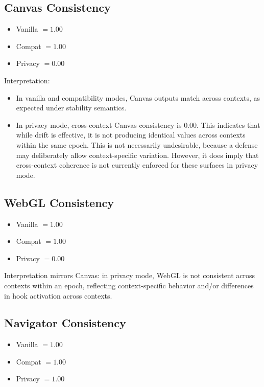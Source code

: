 \documentclass[11pt]{report}
\begin{document}
\subsection{Canvas Consistency}

\begin{itemize}
    \item Vanilla $=1.00$
    \item Compat $=1.00$
    \item Privacy $=0.00$
\end{itemize}

Interpretation:
\begin{itemize}
    \item In vanilla and compatibility modes, Canvas outputs match across contexts, as expected under stability semantics.
    \item In privacy mode, cross-context Canvas consistency is $0.00$. This indicates that while drift is effective, it is not producing identical values across contexts within the same epoch. This is not necessarily undesirable, because a defense may deliberately allow context-specific variation. However, it does imply that cross-context coherence is not currently enforced for these surfaces in privacy mode.
\end{itemize}

\subsection{WebGL Consistency}

\begin{itemize}
    \item Vanilla $=1.00$
    \item Compat $=1.00$
    \item Privacy $=0.00$
\end{itemize}

Interpretation mirrors Canvas: in privacy mode, WebGL is not consistent across contexts within an epoch, reflecting context-specific behavior and/or differences in hook activation across contexts.

\subsection{Navigator Consistency}

\begin{itemize}
    \item Vanilla $=1.00$
    \item Compat $=1.00$
    \item Privacy $=1.00$
\end{itemize}
\end{document}
